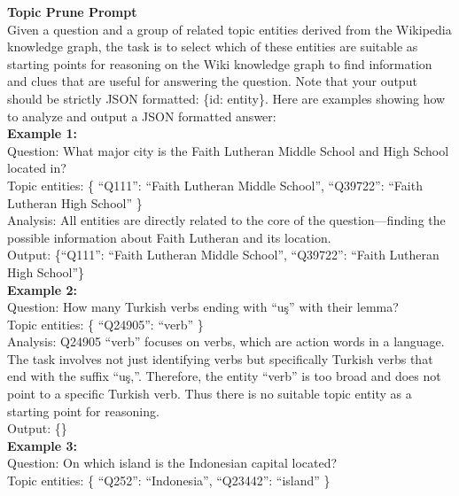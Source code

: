 \documentclass[11pt,UTF8,fontset=fandol]{ctexart}
\begin{document}
\begin{table}[H]\centering
\caption{Topic Prune（主题剪枝提示词）。}
\label{tab:14}
\end{table}
\vspace{-1.2em}
\begin{promptbox}
\small
\textbf{Topic Prune Prompt}\\
Given a question and a group of related topic entities derived from the Wikipedia knowledge graph, the task is to select which of these entities are suitable as starting points for reasoning on the Wiki knowledge graph to find information and clues that are useful for answering the question. Note that your output should be strictly JSON formatted: \{id: entity\}. Here are examples showing how to analyze and output a JSON formatted answer:\\[0.3em]
\textbf{Example 1:}\\
Question: What major city is the Faith Lutheran Middle School and High School located in?\\
Topic entities: \{ ``Q111'': ``Faith Lutheran Middle School'', ``Q39722'': ``Faith Lutheran High School'' \}\\
Analysis: All entities are directly related to the core of the question---finding the possible information about Faith Lutheran and its location.\\
Output: \{``Q111'': ``Faith Lutheran Middle School'', ``Q39722'': ``Faith Lutheran High School''\}\\[0.3em]
\textbf{Example 2:}\\
Question: How many Turkish verbs ending with ``uş'' with their lemma?\\
Topic entities: \{ ``Q24905'': ``verb'' \}\\
Analysis: Q24905 ``verb'' focuses on verbs, which are action words in a language. The task involves not just identifying verbs but specifically Turkish verbs that end with the suffix ``uş,''. Therefore, the entity ``verb'' is too broad and does not point to a specific Turkish verb. Thus there is no suitable topic entity as a starting point for reasoning.\\
Output: \{\}\\[0.3em]
\textbf{Example 3:}\\
Question: On which island is the Indonesian capital located?\\
Topic entities: \{ ``Q252'': ``Indonesia'', ``Q23442'': ``island'' \}\\

\end{promptbox}
\end{document}
